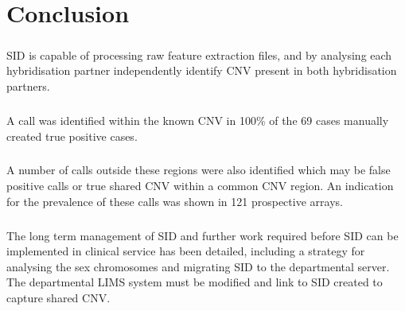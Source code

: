 \chapter{Conclusion}\label{ch:Conclusion} 
\paragraph*{}
SID is capable of processing raw feature extraction files, and by analysing each hybridisation partner independently identify CNV present in both hybridisation partners. 
\paragraph*{}
A call was identified within the known CNV in 100\% of the 69 cases manually created true positive cases.
\paragraph*{}
A number of calls outside these regions were also identified which may be false positive calls or true shared CNV within a common CNV region. An indication for the prevalence of these calls was shown in 121 prospective arrays.
\paragraph*{}
The long term management of SID and further work required before SID can be implemented in clinical service has been detailed, including a strategy for analysing the sex chromosomes and migrating SID to the departmental server. The departmental LIMS system must be modified and link to SID created to capture shared CNV.